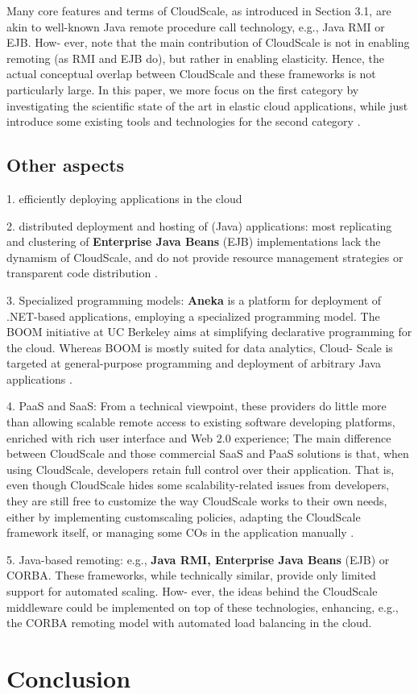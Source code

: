 \documentclass{sig-alternate}
\begin{document}
Many core features and terms of CloudScale, as introduced in Section 3.1, are akin to well-known Java remote procedure call technology, e.g., Java RMI or EJB. How- ever, note that the main contribution of CloudScale is not in enabling remoting (as RMI and EJB do), but rather in enabling elasticity. Hence, the actual conceptual overlap between CloudScale and these frameworks is not particularly large.
In this paper, we more focus on the first category by investigating the scientific state of the art in elastic cloud applications, while just introduce some existing tools and technologies for the second category \cite{Leitner2013}.



\subsection{Other aspects}
1. efficiently deploying applications in the cloud

2. distributed deployment and hosting of (Java) applications: most replicating and clustering of \textbf{Enterprise Java Beans} (EJB) implementations lack the dynamism of CloudScale, and do not provide resource management strategies or transparent code distribution \cite{leitner2012cloudscale}.

3. Specialized programming models: \textbf{Aneka} is a platform for deployment of .NET-based applications, employing a specialized programming model. The BOOM initiative at UC Berkeley aims at simplifying declarative programming for the cloud. Whereas BOOM is mostly suited for data analytics, Cloud- Scale is targeted at general-purpose programming and deployment of arbitrary Java applications \cite{leitner2012cloudscale}. 

4. PaaS and SaaS: From a technical viewpoint, these providers do little more than allowing scalable remote access to existing software developing platforms, enriched with rich user interface and Web 2.0 experience; The main difference between CloudScale and those commercial SaaS and PaaS solutions is that, when using CloudScale, developers retain full control over their application. That is, even though CloudScale hides some scalability-related issues from developers, they are still free to customize the way CloudScale works to their own needs, either by implementing customscaling policies, adapting the CloudScale framework itself, or managing some COs in the application manually \cite{leitner2012cloudscale}. 

5. Java-based remoting: e.g.,\textbf{ Java RMI, Enterprise Java Beans} (EJB) or CORBA. These frameworks, while technically similar, provide only limited support for automated scaling. How- ever, the ideas behind the CloudScale middleware could be implemented on top of these technologies, enhancing, e.g., the CORBA remoting model with automated load balancing in the cloud.




\section{Conclusion}


 
\end{document}
